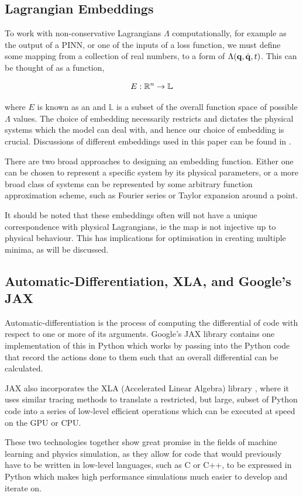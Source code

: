 \subsection{Lagrangian Embeddings}

To work with non-conservative Lagrangians $\Lambda$ computationally, for example as the output of a PINN, or one of the inputs of a loss function, we must define some mapping from a collection of real numbers, to a form of $\Lambda(\vb{q}, \dot{\vb{q}}, t)$. This can be thought of as a function,

\begin{equation}
  E: \mathbb{R}^n \to \mathbb{L}
\end{equation}

where $E$ is known as an  and $\mathbb{L}$ is a subset of the overall function space of possible $\Lambda$ values. 
The choice of embedding necessarily restricts and dictates the physical systems which the model can deal with, and hence our choice of embedding is crucial. Discussions of different embeddings used in this paper can be found in .

There are two broad approaches to designing an embedding function. Either one can be chosen to represent a specific system by its physical parameters, or a more broad class of systems can be represented by some arbitrary function approximation scheme, such as Fourier series or Taylor expansion around a point.

It should be noted that these embeddings often will not have a unique correspondence with physical Lagrangians, ie the map is not injective up to physical behaviour. This has implications for optimisation in creating multiple minima, as will be discussed.

\subsection{Automatic-Differentiation, XLA, and Google's JAX}
\label{sec:intro-autodiff}

Automatic-differentiation is the process of computing the differential of  code with respect to one or more of its arguments. Google's JAX library \cite{jax2018github} contains one implementation of this in Python which works by passing  into the Python code that record the actions done to them such that an overall differential can be calculated.

JAX also incorporates the XLA (Accelerated Linear Algebra) library \cite{openxla-xla}, where it uses similar tracing methods to translate a restricted, but large, subset of Python code into a series of low-level efficient operations which can be executed at speed on the GPU or CPU.

These two technologies together show great promise in the fields of machine learning and physics simulation, as they allow for code that would previously have to be written in low-level languages, such as C or C++, to be expressed in Python which makes high performance simulations much easier to develop and iterate on.
